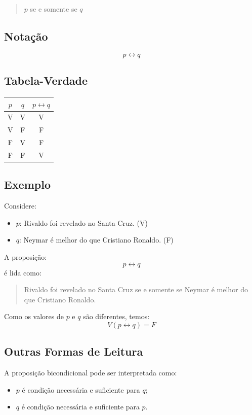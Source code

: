 \begin{quote}
$p$ se e somente se $q$
\end{quote}

\subsection{Notação}

\[
p \leftrightarrow q
\]

\subsection{Tabela-Verdade}

\begin{center}
\begin{tabular}{|c|c|c|}
\hline
$p$ & $q$ & $p \leftrightarrow q$ \\
\hline
V & V & V \\
V & F & F \\
F & V & F \\
F & F & V \\
\hline
\end{tabular}
\end{center}

\subsection{Exemplo}

Considere:
\begin{itemize}
    \item $p$: Rivaldo foi revelado no Santa Cruz. (V)
    \item $q$: Neymar é melhor do que Cristiano Ronaldo. (F)
\end{itemize}

A proposição:
\[
p \leftrightarrow q
\]
é lida como:

\begin{quote}
Rivaldo foi revelado no Santa Cruz se e somente se Neymar é melhor do que Cristiano Ronaldo.
\end{quote}

Como os valores de $p$ e $q$ são diferentes, temos:
\[
V(p \leftrightarrow q) = F
\]

\subsection{Outras Formas de Leitura}

A proposição bicondicional pode ser interpretada como:
\begin{itemize}
    \item $p$ é condição necessária e suficiente para $q$;
    \item $q$ é condição necessária e suficiente para $p$.
\end{itemize}